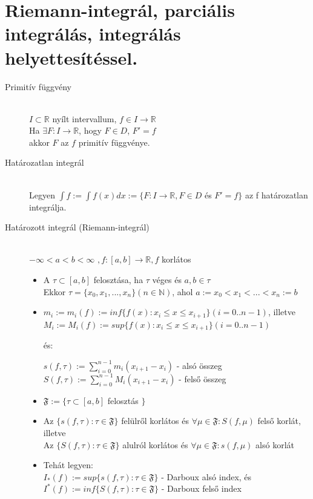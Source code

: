 \documentclass[margin=0px]{article}
\newcommand{\R}{\mathbb{R}}
\begin{document}
\section{Riemann-integrál, parciális integrálás, integrálás helyettesítéssel.}
\begin{description}
    \item[Primitív függvény] \hfill \\
        $ I \subset \R $ nyílt intervallum, $ f \in I \rightarrow \R $ \\
        Ha $ \exists  F:I\rightarrow\R $, hogy  $ F \in D $, $F' = f$ \\
        akkor $ F $ az $ f $ primitív függvénye.

    \item[Határozatlan integrál] \hfill \\
        Legyen $ \int{f} := \int f(x)dx :=  \{F:I \rightarrow \R, F \in D $
        és $ F' = f  \} $ az f határozatlan integrálja.

    \item[Határozott integrál (Riemann-integrál)] \hfill \\
        $ -\infty < a < b < \infty$
        $, f:[a,b] \rightarrow \R, f $ korlátos
        \begin{itemize}
            \item
                  A $ \tau \subset [a,b] $ felosztása, ha $ \tau $ véges és $ a,b \in \tau $ \\
                  Ekkor $ \tau = \{x_0, x_1, ..., x_n \} (n \in \mathbb{N}) $, ahol
                  $ a := x_0 < x_1 < ... < x_n := b$
            \item
                  $ m_i := m_i(f) := inf\{f(x): x_i \leq x \leq x_{i+1} \} (i = 0..n-1)$, illetve \\
                  $ M_i := M_i(f) := sup\{f(x): x_i \leq x \leq x_{i+1} \} (i = 0..n-1)$

                  és:

                  $ s(f, \tau) := \sum\limits_{i=0}^{n-1} m_i(x_{i+1} - x_i) $ - alsó összeg \\
                  $ S(f, \tau) := \sum\limits_{i=0}^{n-1} M_i(x_{i+1} - x_i) $ - felső összeg

            \item
                  $ \mathfrak{F} := \{ \tau \subset [a,b] $ felosztás $\}$
            \item
                  Az $ \{ s(f, \tau): \tau \in \mathfrak{F} \} $ felülről korlátos és $ \forall \mu \in \mathfrak{F} : S(f, \mu) $ felső korlát, illetve \\
                  Az $ \{ S(f, \tau): \tau \in \mathfrak{F} \} $ alulról korlátos és $ \forall \mu \in \mathfrak{F} : s(f, \mu) $ alsó korlát
            \item
                  Tehát legyen: \\ $ I_*(f) := sup\{ s(f,\tau) : \tau \in \mathfrak{F} \}$ - Darboux alsó index, és \\
                  $ I^*(f) := inf\{ S(f,\tau) : \tau \in \mathfrak{F} \}$ - Darboux felső index
        \end{itemize}


\end{description}
\end{document}
